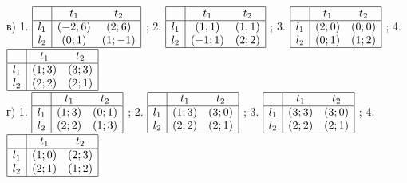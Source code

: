 {в)	1.  $\begin{array}{|c|cc|}  \hline {} & {t_{1} } & {t_{2} } \\  \hline {l_{1} } & {\left(-2;6\right)} & {\left(2;6\right)} \\ {l_{2} } & {\left(0;1\right)} & {\left(1;-1\right)} \\  \hline  \end{array}$ ; 2.  $\begin{array}{|c|cc|}  \hline {} & {t_{1} } & {t_{2} } \\  \hline {l_{1} } & {\left(1;1\right)} & {\left(1;1\right)} \\ {l_{2} } & {\left(-1;1\right)} & {\left(2;2\right)} \\  \hline  \end{array}$ ; 3.  $\begin{array}{|c|cc|}  \hline {} & {t_{1} } & {t_{2} } \\  \hline {l_{1} } & {\left(2;0\right)} & {\left(0;0\right)} \\ {l_{2} } & {\left(0;1\right)} & {\left(1;2\right)} \\  \hline  \end{array}$ ; 4.  $\begin{array}{|c|cc|}  \hline {} & {t_{1} } & {t_{2} } \\  \hline {l_{1} } & {\left(1;3\right)} & {\left(3;3\right)} \\ {l_{2} } & {\left(2;2\right)} & {\left(2;1\right)} \\  \hline  \end{array}$ \\
г)	1.  $\begin{array}{|c|cc|}  \hline {} & {t_{1} } & {t_{2} } \\  \hline {l_{1} } & {\left(1;3\right)} & {\left(0;1\right)} \\ {l_{2} } & {\left(2;2\right)} & {\left(1;3\right)} \\  \hline  \end{array}$ ; 2.  $\begin{array}{|c|cc|}  \hline {} & {t_{1} } & {t_{2} } \\  \hline {l_{1} } & {\left(1;3\right)} & {\left(3;0\right)} \\ {l_{2} } & {\left(2;2\right)} & {\left(2;1\right)} \\  \hline  \end{array}$ ; 3.  $\begin{array}{|c|cc|}  \hline {} & {t_{1} } & {t_{2} } \\  \hline {l_{1} } & {\left(3;3\right)} & {\left(3;0\right)} \\ {l_{2} } & {\left(2;2\right)} & {\left(2;1\right)} \\  \hline  \end{array}$ ; 4.  $\begin{array}{|c|cc|}  \hline {} & {t_{1} } & {t_{2} } \\  \hline {l_{1} } & {\left(1;0\right)} & {\left(2;3\right)} \\ {l_{2} } & {\left(2;1\right)} & {\left(1;2\right)} \\  \hline  \end{array}$ \\
}
